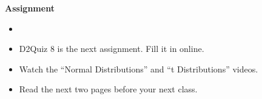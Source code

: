 


\begin{center}
  {\large\bf Assignment}
\end{center}

\begin{itemize}
\item 
\item D2Quiz 8 is the next assignment.  Fill it in online.
\item Watch the ``Normal Distributions'' and ``t Distributions''  videos.
\item Read the next two pages before your next class.
\end{itemize}

